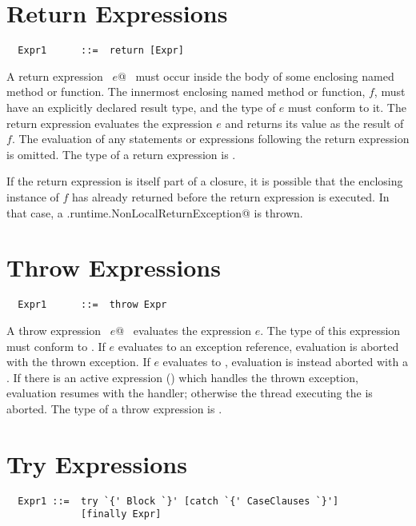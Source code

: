 \section{Return Expressions}

\syntax\begin{lstlisting}
  Expr1      ::=  return [Expr]
\end{lstlisting}

A return expression ~\lstinline@return $e$@~ must occur inside the body of some
enclosing named method or function. The innermost enclosing named
method or function, $f$, must have an explicitly declared result type,
and the type of $e$ must conform to it.  The return expression
evaluates the expression $e$ and returns its value as the result of
$f$. The evaluation of any statements or
expressions following the return expression is omitted. The type of 
a return expression is .

If the return expression is itself part of a closure, it is possible
that the enclosing instance of $f$ has already returned before the
return expression is executed. In that case, a 
\lstinline@scala.runtime.NonLocalReturnException@ is thrown.

\section{Throw Expressions}

\syntax\begin{lstlisting}
  Expr1      ::=  throw Expr
\end{lstlisting}

A throw expression ~\lstinline@throw $e$@~ evaluates the expression
$e$. The type of this expression must conform to
.  If $e$ evaluates to an exception
reference, evaluation is aborted with the thrown exception. If $e$
evaluates to , evaluation is instead aborted with a
. If there is an active
 expression () which handles the thrown
exception, evaluation resumes with the handler; otherwise the thread
executing the  is aborted.  The type of a throw expression
is .

\section{Try Expressions}\label{sec:try}

\syntax\begin{lstlisting}
  Expr1 ::=  try `{' Block `}' [catch `{' CaseClauses `}'] 
             [finally Expr]
\end{lstlisting}

